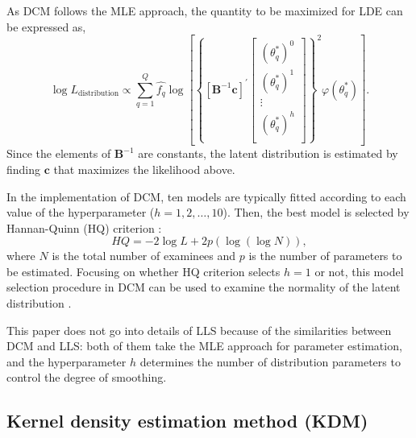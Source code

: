 As DCM follows the MLE approach, the quantity to be maximized for
LDE can be expressed as,
\begin{equation}
\log{L_{\text{distribution}}} \propto
\sum_{q = 1}^{Q}{
\hat{f_{q}}\log\left[
\left\{
\left[ \mathrm{\mathbf{B}}^{-1} \mathrm{\mathbf{c}} \right]^{'}
\begin{bmatrix}
\left( \theta_{q}^{*} \right)^{0} \\
\left( \theta_{q}^{*} \right)^{1} \\
\vdots \\
\left( \theta_{q}^{*} \right)^{h} \\
\end{bmatrix}
\right\}^{2}
\varphi{\left( \theta_{q}^{*} \right)}
\right]
}.
\label{eq:dcmlikeli}
\end{equation}
Since the elements of \(\mathrm{\mathbf{B}}^{-1}\) are constants, the
latent distribution is estimated by finding \(\mathrm{\mathbf{c}}\) that
maximizes the likelihood above.

In the implementation of DCM, ten models are typically fitted according to each
value of the hyperparameter (\(h = 1, 2, \dots, 10\)). Then, the best model is selected by
Hannan-Quinn (HQ) criterion \citep{Hannan+Quinn:1979}:
\begin{equation}
HQ = -2 \log{L} + 2 p \left( \log{(\log{N})} \right),
\label{eq:hq}
\end{equation}
where \(N\) is the total number of examinees and \(p\) is the number of
parameters to be estimated. Focusing on whether HQ criterion selects
\(h = 1\) or not, this model selection procedure in DCM can be used to
examine the normality of the latent distribution \citep{Woods+Lin:2009}.

This paper does not go into details of LLS \citep{Casabianca+Lewis:2015, Xu+vonDavier:2008}
because of the similarities between DCM and LLS: both of them
take the MLE approach for parameter estimation, and the hyperparameter \(h\)
determines the number of distribution parameters to control the degree of smoothing.

\hypertarget{kernel-density-estimation-method-kdm}{%
\subsection{Kernel density estimation method (KDM)}\label{kernel-density-estimation-method-kdm}}

